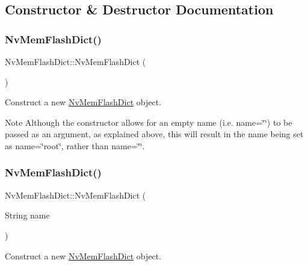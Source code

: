 \subsection{Constructor \& Destructor Documentation}
\mbox{\label{class_nv_mem_flash_dict_a2756e9c688e80634ea15f5ded9a3cd6f}} 
\subsubsection{\texorpdfstring{NvMemFlashDict()}{NvMemFlashDict()}\hspace{0.1cm}{\footnotesize\ttfamily [1/2]}}
{\footnotesize\ttfamily Nv\+Mem\+Flash\+Dict\+::\+Nv\+Mem\+Flash\+Dict (\begin{DoxyParamCaption}{ }\end{DoxyParamCaption})}



Construct a new \mbox{\hyperlink{class_nv_mem_flash_dict}{Nv\+Mem\+Flash\+Dict}} object. 

\begin{DoxyNote}{Note}
Although the constructor allows for an empty name (i.\+e. {\ttfamily name=\char`\"{}\char`\"{}}) to be passed as an argument, as explained above, this will result in the name being set as {\ttfamily name=\char`\"{}root\char`\"{}}, rather than {\ttfamily name=\char`\"{}\char`\"{}}. 
\end{DoxyNote}
\mbox{\label{class_nv_mem_flash_dict_aae2853114a90569df480672f870818b2}} 
\subsubsection{\texorpdfstring{NvMemFlashDict()}{NvMemFlashDict()}\hspace{0.1cm}{\footnotesize\ttfamily [2/2]}}
{\footnotesize\ttfamily Nv\+Mem\+Flash\+Dict\+::\+Nv\+Mem\+Flash\+Dict (\begin{DoxyParamCaption}\item[{String}]{name }\end{DoxyParamCaption})}



Construct a new \mbox{\hyperlink{class_nv_mem_flash_dict}{Nv\+Mem\+Flash\+Dict}} object. 


